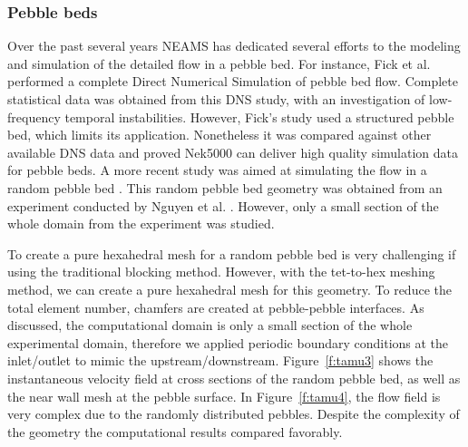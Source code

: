\subsubsection{Pebble beds}

Over the past several years NEAMS has dedicated several efforts to the modeling and simulation of the detailed flow in a pebble bed. For instance, Fick et al. \cite{fick2017direct}  performed a complete Direct Numerical Simulation of pebble bed flow. Complete statistical data was obtained from this DNS study, with an investigation of low-frequency temporal instabilities. However, Fick's study \cite{fick2017direct} used a structured pebble bed, which limits its application. Nonetheless it was compared against other available DNS data and proved Nek5000 can deliver high quality simulation data for pebble beds. A more recent study was aimed at simulating the flow in a random pebble bed \cite{yildiz2020direct}. This random pebble bed geometry was obtained from an experiment conducted by Nguyen et al. \cite{nguyen2018time}. However, only a small section of the whole domain from the experiment was studied.

To create a pure hexahedral mesh for a random pebble bed is very challenging if using the traditional blocking method. However, with the tet-to-hex meshing method, we can create a pure hexahedral mesh for this geometry. To reduce the total element number, chamfers are created at pebble-pebble interfaces. As discussed, the computational domain is only a small section of the whole experimental domain, therefore we applied periodic boundary conditions at the inlet/outlet to mimic the upstream/downstream. Figure~\ref{f:tamu3} shows the instantaneous velocity field at cross sections of the random pebble bed, as well as the near wall mesh at the pebble surface. In Figure~\ref{f:tamu4}, the flow field is very complex due to the randomly distributed pebbles. Despite the complexity of the geometry the computational results compared favorably.

